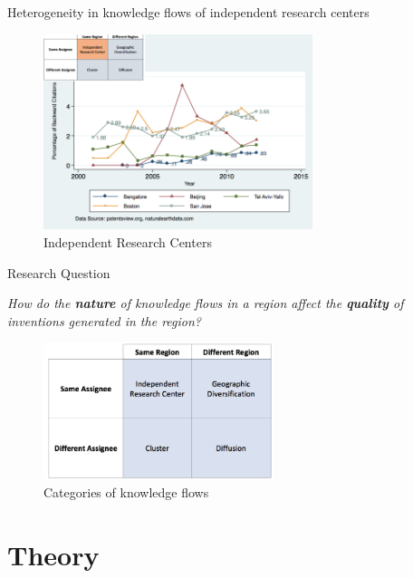 \documentclass{beamer}
\begin{document}
\begin{frame}{Heterogeneity in knowledge flows of independent research centers}
\begin{figure}[h]
\begin{centering}
  \includegraphics[width=0.7\textwidth]{SMSSameRegionSameAssigneeFlows.png}
  \caption{Independent Research Centers}
   \label{fig:SMSSameRegionSameAssigneeFlows}
\end{centering}
\end{figure}
\end{frame}




\begin{frame}{Research Question}{}

\textit{How do the \textbf{nature} of knowledge flows in a region affect the \textbf{quality} of inventions generated in the region?}
\begin{figure}[h!]
\begin{centering}
  \includegraphics[width=0.6\textwidth]{2x2old}
  \caption{Categories of knowledge flows}
   \label{fig:2x2old}
\end{centering}
\end{figure}
\end{frame}

\section{Theory}
\end{document}
